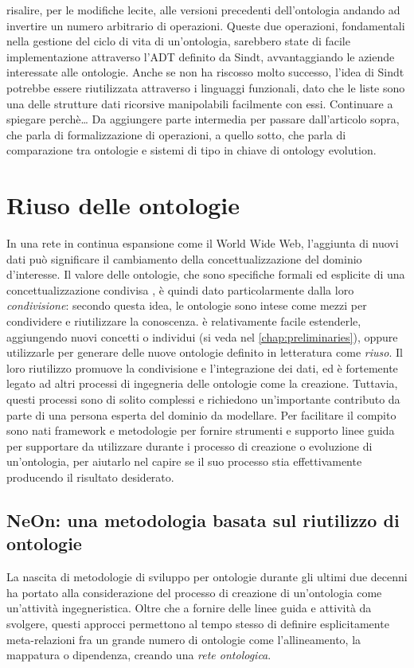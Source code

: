 risalire, per le modifiche lecite, alle versioni precedenti dell'ontologia andando ad invertire un numero arbitrario di operazioni.
Queste due operazioni, fondamentali nella gestione del ciclo di vita di un'ontologia, sarebbero state di facile implementazione attraverso l'ADT definito da Sindt, avvantaggiando le aziende interessate alle ontologie. Anche se non ha riscosso molto successo, l'idea di Sindt potrebbe essere riutilizzata attraverso i linguaggi funzionali, dato che le liste sono una delle strutture dati ricorsive manipolabili facilmente con essi. Continuare a spiegare perchè…
Da aggiungere parte intermedia per passare dall'articolo sopra, che parla di formalizzazione di operazioni, a quello sotto, che parla di comparazione tra ontologie e sistemi di tipo in chiave di ontology evolution.
\evv
\section{Riuso delle ontologie}
\label{sec:OntoReuse}
In una rete in continua espansione come il World Wide Web, l'aggiunta di nuovi dati può significare il cambiamento della concettualizzazione del dominio d'interesse. Il valore delle ontologie, che sono specifiche formali ed esplicite di una concettualizzazione condivisa \cite{goy2015ontologies}, è quindi dato particolarmente dalla loro \textit{condivisione}: secondo questa idea, le ontologie sono intese come mezzi per condividere e riutilizzare la conoscenza. è relativamente facile estenderle, aggiungendo nuovi concetti o individui (si veda nel \autoref{chap:preliminaries}), oppure utilizzarle per generare delle nuove ontologie definito in letteratura come \textit{riuso}. Il loro riutilizzo promuove la condivisione e l'integrazione dei dati, ed è fortemente legato ad altri processi di ingegneria delle ontologie come la creazione. Tuttavia, questi processi sono di solito complessi e richiedono un'importante contributo da parte di una persona esperta del dominio da modellare. Per facilitare il compito sono nati framework e metodologie per fornire strumenti e supporto linee guida per supportare da utilizzare durante i processo di creazione o evoluzione di un’ontologia, per aiutarlo nel capire se il suo processo stia effettivamente producendo il risultato desiderato.
\subsection{NeOn: una metodologia basata sul riutilizzo di ontologie}
La nascita di metodologie di sviluppo per ontologie durante gli ultimi due decenni ha portato alla considerazione del processo di creazione di un'ontologia come un'attività ingegneristica. Oltre che a fornire delle linee guida e attività da svolgere, questi approcci permettono al tempo stesso di definire esplicitamente meta-relazioni 
fra un grande numero di ontologie come l’allineamento, la mappatura \cite{choi2006Mapping} o dipendenza, creando una \textit{rete ontologica}.

